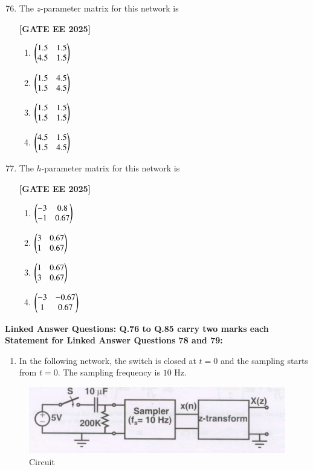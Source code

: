 \documentclass[12pt]{article}
\begin{document}
\begin{enumerate}[leftmargin=*, label=\textbf{Q.\arabic*:}]
\setcounter{enumi}{75}

\item The $z$-parameter matrix for this network is
 
\noindent \textbf{[GATE EE 2025]}
\begin{multicols}{4}
\begin{enumerate}
  \item $\begin{pmatrix} 1.5 & 1.5 \\ 4.5 & 1.5 \end{pmatrix}$
  \item $\begin{pmatrix} 1.5 & 4.5 \\ 1.5 & 4.5 \end{pmatrix}$
  \item $\begin{pmatrix} 1.5 & 1.5 \\ 1.5 & 1.5 \end{pmatrix}$
  \item $\begin{pmatrix} 4.5 & 1.5 \\ 1.5 & 4.5 \end{pmatrix}$
\end{enumerate}
\end{multicols}

\item The $h$-parameter matrix for this network is
 
\noindent \textbf{[GATE EE 2025]}
\begin{multicols}{4}
\begin{enumerate}
  \item $\begin{pmatrix} -3 & 0.8 \\ -1 & 0.67 \end{pmatrix}$
  \item $\begin{pmatrix} 3 & 0.67 \\ 1 & 0.67 \end{pmatrix}$
  \item $\begin{pmatrix} 1 & 0.67 \\ 3 & 0.67 \end{pmatrix}$
  \item $\begin{pmatrix} -3 & -0.67 \\ 1 & 0.67 \end{pmatrix}$
\end{enumerate}
\end{multicols}

\end{enumerate}


 \large \textbf {Linked Answer Questions: Q.76 to Q.85 carry two marks each}
 \large \textbf {Statement for Linked Answer Questions 78 and 79: }

 \begin{enumerate}
\item In the following network, the switch is closed at $t=0$ and the sampling starts from $t=0$. The sampling frequency is $10$ Hz.
\end{enumerate}
\begin{figure}[H]\centering
\includegraphics[width=0.6\columnwidth]{figs/q7879.png}
\caption{Circuit}
\label{fig:q7879}
\end{figure}
\end{document}
